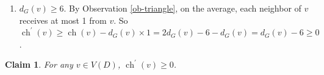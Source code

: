 \documentclass{article}
\newtheorem{claim}{Claim}
\begin{document}
\begin{enumerate}[label=(\arabic*)]
If $v$ is $1$-triangular, say $f_1=[v_1v_2v]$ is a triangular face incident with $v$, then 
by Observation \ref{ob-triangle}, $f_1$ and $v_1, v_2$ receive at most $3/2$ charge from $v$.

By Lemmas \ref{lem:14} and \ref{lem:15}, $v$ has at most two internal isolated $3$-neighbors,  which may receives $1$ from $v$ by R2(2). So $\operatorname{ch}^{\prime}(v)\ge \operatorname{ch}(v)-\frac{3}{2}-2\times1=\frac{1}{2}>0$. 

If $v$ is $2$-triangular, say $f_1=[v_1v_2v]$ and $f_3=[v_3v_4v]$ are two triangles incident with $v$, then by Observation \ref{ob-triangle}, for each $i \in \{1,3\}$,  $f_i$ together with $v_i, v_{i+1}$ receives at most $3/2$ charge from $v$, and $v_5$  receives at most 1 from $v$ by R2(2). So $\operatorname{ch}^{\prime}(v)\ge  \operatorname{ch}(v)-2\times1 - 2\times\frac{1}{2}-1 = 0$.

\item $d_G(v) \ge 6$. By Observation \ref{ob-triangle}, on the average,
each neighbor of $v$ receives at most 1 from $v$.
So $\operatorname{ch}^{\prime}(v)\ge  \operatorname{ch}(v)-d_G(v)\times1 = 2d_G(v)-6 - d_G(v)=d_G(v)-6\ge 0$.
\end{enumerate}

\begin{claim}
    For any $v\in V(D)$, $\operatorname{ch}^{\prime}(v)\ge 0$.
\end{claim}
\end{document}
